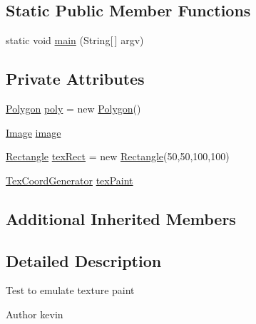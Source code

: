 \subsection*{Static Public Member Functions}
\begin{DoxyCompactItemize}
\item 
static void \mbox{\hyperlink{classorg_1_1newdawn_1_1slick_1_1tests_1_1_texture_paint_test_ac0a3ed027d60359b21b4b1a73f14ffc4}{main}} (String\mbox{[}$\,$\mbox{]} argv)
\end{DoxyCompactItemize}
\subsection*{Private Attributes}
\begin{DoxyCompactItemize}
\item 
\mbox{\hyperlink{classorg_1_1newdawn_1_1slick_1_1geom_1_1_polygon}{Polygon}} \mbox{\hyperlink{classorg_1_1newdawn_1_1slick_1_1tests_1_1_texture_paint_test_aeb688ec54d31a4ae76c2d8c9ffa2d57c}{poly}} = new \mbox{\hyperlink{classorg_1_1newdawn_1_1slick_1_1geom_1_1_polygon}{Polygon}}()
\item 
\mbox{\hyperlink{classorg_1_1newdawn_1_1slick_1_1_image}{Image}} \mbox{\hyperlink{classorg_1_1newdawn_1_1slick_1_1tests_1_1_texture_paint_test_a305aa97ece19d7dd158aea1e8fe963c4}{image}}
\item 
\mbox{\hyperlink{classorg_1_1newdawn_1_1slick_1_1geom_1_1_rectangle}{Rectangle}} \mbox{\hyperlink{classorg_1_1newdawn_1_1slick_1_1tests_1_1_texture_paint_test_aad56335d65c2c5a35f0b2475c7187886}{tex\+Rect}} = new \mbox{\hyperlink{classorg_1_1newdawn_1_1slick_1_1geom_1_1_rectangle}{Rectangle}}(50,50,100,100)
\item 
\mbox{\hyperlink{interfaceorg_1_1newdawn_1_1slick_1_1geom_1_1_tex_coord_generator}{Tex\+Coord\+Generator}} \mbox{\hyperlink{classorg_1_1newdawn_1_1slick_1_1tests_1_1_texture_paint_test_abe40a374badc7dd300ac476ba5021f5d}{tex\+Paint}}
\end{DoxyCompactItemize}
\subsection*{Additional Inherited Members}


\subsection{Detailed Description}
Test to emulate texture paint

\begin{DoxyAuthor}{Author}
kevin 
\end{DoxyAuthor}


